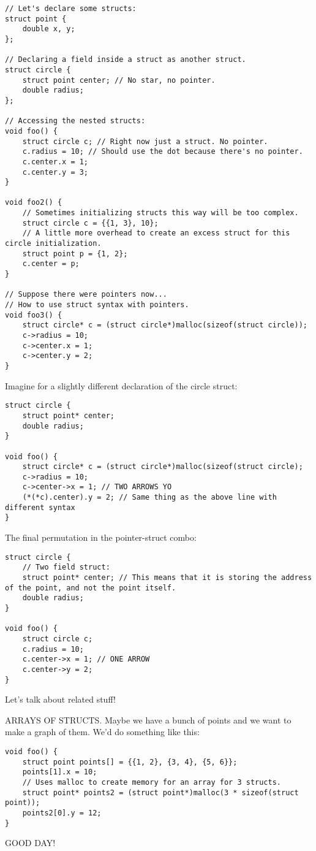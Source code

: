 \documentclass[12pt]{article}
\theoremstyle{definition}
\begin{document}
\begin{lstlisting}
// Let's declare some structs:
struct point {
    double x, y;
};

// Declaring a field inside a struct as another struct.
struct circle {
    struct point center; // No star, no pointer.
    double radius;
};

// Accessing the nested structs:
void foo() {
    struct circle c; // Right now just a struct. No pointer. 
    c.radius = 10; // Should use the dot because there's no pointer.
    c.center.x = 1;
    c.center.y = 3;
}

void foo2() {
    // Sometimes initializing structs this way will be too complex. 
    struct circle c = {{1, 3}, 10};
    // A little more overhead to create an excess struct for this circle initialization. 
    struct point p = {1, 2};
    c.center = p;
}

// Suppose there were pointers now...
// How to use struct syntax with pointers. 
void foo3() {
    struct circle* c = (struct circle*)malloc(sizeof(struct circle));
    c->radius = 10;
    c->center.x = 1;
    c->center.y = 2;
}
\end{lstlisting}

Imagine for a slightly different declaration of the circle struct:
\begin{lstlisting}
struct circle {
    struct point* center;
    double radius;
}

void foo() {
    struct circle* c = (struct circle*)malloc(sizeof(struct circle);
    c->radius = 10;
    c->center->x = 1; // TWO ARROWS YO
    (*(*c).center).y = 2; // Same thing as the above line with different syntax
}
\end{lstlisting}

The final permutation in the pointer-struct combo:
\begin{lstlisting}
struct circle {
    // Two field struct:
    struct point* center; // This means that it is storing the address of the point, and not the point itself.
    double radius;
}

void foo() {
    struct circle c;
    c.radius = 10;
    c.center->x = 1; // ONE ARROW
    c.center->y = 2;
}
\end{lstlisting}

Let's talk about related stuff!

ARRAYS OF STRUCTS.
Maybe we have a bunch of points and we want to make a graph of them. We'd do something like this:
\begin{lstlisting}
void foo() {
    struct point points[] = {{1, 2}, {3, 4}, {5, 6}};
    points[1].x = 10;
    // Uses malloc to create memory for an array for 3 structs. 
    struct point* points2 = (struct point*)malloc(3 * sizeof(struct point));
    points2[0].y = 12;
}
\end{lstlisting}
GOOD DAY!
\end{document}
